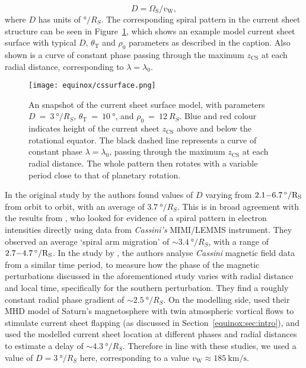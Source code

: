 \begin{equation}\label{equinox:eq:D}
D = \Omega_\mathrm{S}/v_\mathrm{W},
\end{equation}
where $D$ has units of $\si{\degree\per R_S}$. The corresponding spiral pattern in the current sheet structure can be seen in Figure~\ref{equinox:fig:cssurfacemodel}, which shows an example model current sheet surface with typical $D$, $\theta_\mathrm{T}$ and $\rho_0$ parameters as described in the caption. Also shown is a curve of constant phase passing through the maximum $z_\mathrm{CS}$ at each radial distance, corresponding to $\lambda=\lambda_0$.
\begin{figure}
\centering
\texttt{[image: equinox/cssurface.png]}
\caption[Snapshot of tilted, rippled current sheet surface model.]{An snapshot of the current sheet surface model, with parameters $D~{=}~\SI{3}{\degree/R_S}$, $\theta_\mathrm{T}~{=}~\SI{10}{\degree}$, and $\rho_0~{=}~\SI{12}{R_S}$. Blue and red colour indicates height of the current sheet $z_\mathrm{CS}$ above and below the rotational equator. The black dashed line represents a curve of constant phase $\lambda = \lambda_0$, passing through the maximum $z_\mathrm{CS}$ at each radial distance. The whole pattern then rotates with a variable period close to that of planetary rotation.}
\label{equinox:fig:cssurfacemodel}
\end{figure}

In the original study by \citet{arridge2011} the authors found values of $D$ varying from $2.1{\--}\SI{6.7}{\degree/R_S}$ from orbit to orbit, with an average of $\SI{3.7}{\degree/R_S}$. This is in broad agreement with the results from \citet{carbary2007}, who looked for evidence of a spiral pattern in electron intensities directly using data from \textit{Cassini's} MIMI/LEMMS instrument. They observed an average `spiral arm migration' of ${{\sim}}\SI{3.4}{\degree/R_S}$, with a range of $2.7{\--}\SI{4.7}{\degree/R_S}$. In the study by \citet{provan2012}, the authors analyse \textit{Cassini} magnetic field data from a similar time period, to measure how the phase of the magnetic perturbations discussed in the aforementioned \citet{andrews2012} study varies with radial distance and local time, specifically for the southern perturbation. They find a roughly constant radial phase gradient of ${{\sim}}\SI{2.5}{\degree/R_S}$. On the modelling side, \citet{jiaandkivelson2012} used their MHD model of Saturn's magnetosphere with twin atmospheric vortical flows to stimulate current sheet flapping (as discussed in Section~\ref{equinox:sec:intro}), and used the modelled current sheet location at different phases and radial distances to estimate a delay of ${\sim}\SI{4.3}{\degree/R_S}$. Therefore in line with these studies, we used a value of $D = \SI{3}{\degree/R_S}$ here, corresponding to a value $v_\mathrm{W} \approx \SI{185}{\km\per\second}$.

